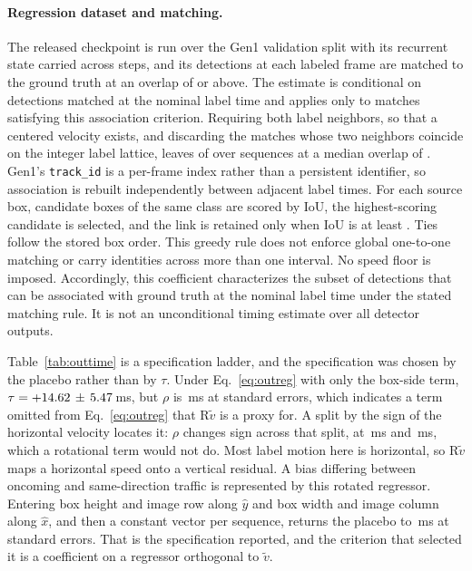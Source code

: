 \documentclass[10pt,twocolumn,letterpaper]{article}
\begin{document}
\paragraph{Regression dataset and matching.}
The released checkpoint is run over the Gen1 validation split with its recurrent
state carried across steps, and its detections at each labeled frame are matched
to the ground truth at an overlap of \outIoUfloor{} or above. The estimate is
conditional on detections matched at the nominal label time and applies only to
matches satisfying this association criterion.
Requiring both
label neighbors, so that a centered velocity exists, and discarding the matches
whose two neighbors coincide on the integer label lattice, leaves \outMatches{}
of \outRowsTotal{} over \outSeqs{} sequences at a median overlap of \outIoUmedian{}. Gen1's \texttt{track\_id} is a per-frame index rather
than a persistent identifier, so association is rebuilt independently between
adjacent label times. For each source box, candidate boxes of the same class are
scored by IoU, the highest-scoring candidate is selected, and the link is retained
only when IoU is at least \outIoUfloor{}. Ties follow the stored box order. This
greedy rule does not enforce global one-to-one matching or carry identities across
more than one interval. No speed floor is imposed.
Accordingly, this coefficient characterizes the subset of detections that can be
associated with ground truth at the nominal label time under the stated matching
rule. It is not an unconditional timing estimate over all detector outputs.

Table~\ref{tab:outtime} is a specification ladder, and the specification was
chosen by the placebo rather than by $\tau$. Under Eq.~\ref{eq:outreg} with only
the box-side term, $\tau=+14.62\,\pm\,5.47$\,ms, but $\rho$ is
\ladderMinPl\,ms at \ladderMinPlSigmas{} standard errors, which indicates a term
omitted from Eq.~\ref{eq:outreg} that $\mathrm{R}\tilde v$ is a proxy for. A split by
the sign of the horizontal velocity locates it: $\rho$ changes sign across that
split, at \plRight\,ms and \plLeft\,ms, which a rotational term would not do.
Most label motion here is horizontal, so $\mathrm{R}\tilde v$ maps a horizontal speed
onto a vertical residual. A bias differing between oncoming and same-direction
traffic is represented by this rotated regressor. Entering
box height and image row along $\hat{y}$ and box width and image column along
$\hat{x}$, and then a constant vector per sequence, returns the placebo to
\ladderFullPl\,ms at \ladderFullPlSigmas{} standard errors. That is the
specification reported, and the criterion that selected it is a coefficient on a
regressor orthogonal to $\tilde v$.
\end{document}
